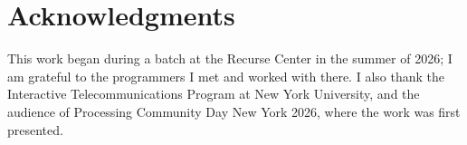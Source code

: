 \section*{Acknowledgments}

This work began during a batch at the Recurse Center in the summer of 2026; I am grateful to the programmers I met and worked with there. I also thank the Interactive Telecommunications Program at New York University, and the audience of Processing Community Day New York 2026, where the work was first presented.
